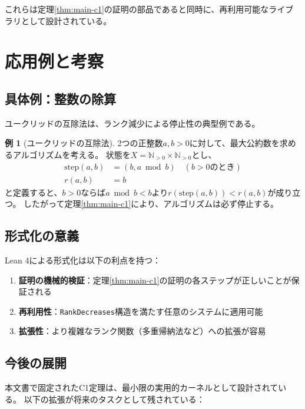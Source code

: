 \documentclass[11pt,a4paper]{ltjsarticle}
\theoremstyle{definition}
\newtheorem{example}[definition]{例}
\begin{document}
これらは定理\ref{thm:main-c1}の証明の部品であると同時に、再利用可能なライブラリとして設計されている。

\section{応用例と考察}
\label{sec:examples}

\subsection{具体例：整数の除算}

ユークリッドの互除法は、ランク減少による停止性の典型例である。

\begin{example}[ユークリッドの互除法]
\label{ex:gcd}
2つの正整数$a, b > 0$に対して、最大公約数を求めるアルゴリズムを考える。
状態を$X = \mathbb{N}_{>0} \times \mathbb{N}_{>0}$とし、
\begin{align*}
\mathrm{step}(a, b) &= (b, a \bmod b) \quad (b > 0のとき)\\
r(a, b) &= b
\end{align*}
と定義すると、$b > 0$ならば$a \bmod b < b$より$r(\mathrm{step}(a,b)) < r(a,b)$が成り立つ。
したがって定理\ref{thm:main-c1}により、アルゴリズムは必ず停止する。
\end{example}

\subsection{形式化の意義}

Lean 4による形式化は以下の利点を持つ：

\begin{enumerate}[leftmargin=*]
\item \textbf{証明の機械的検証}：定理\ref{thm:main-c1}の証明の各ステップが正しいことが保証される
\item \textbf{再利用性}：\texttt{RankDecreases}構造を満たす任意のシステムに適用可能
\item \textbf{拡張性}：より複雑なランク関数（多重帰納法など）への拡張が容易
\end{enumerate}

\subsection{今後の展開}

本文書で固定されたC1定理は、最小限の実用的カーネルとして設計されている。
以下の拡張が将来のタスクとして残されている：
\end{document}
